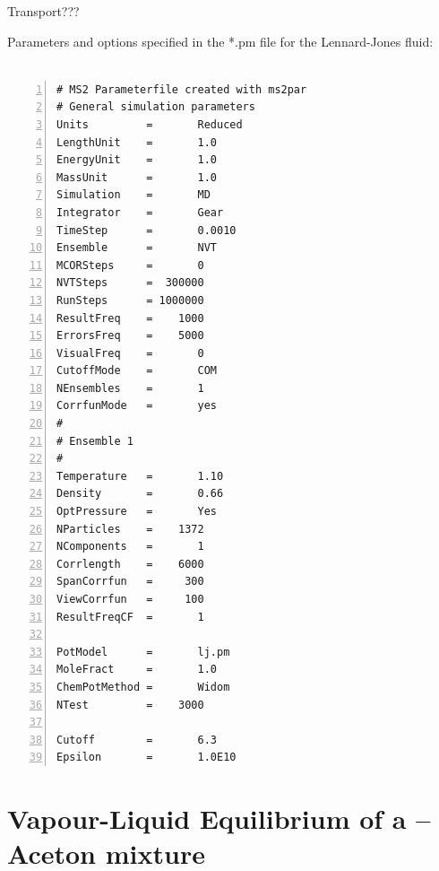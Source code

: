 Transport???


Parameters and options specified in the *.pm file for the Lennard-Jones fluid:\\\\

\begin{Verbatim}[frame=single,framesep=6.5mm,label=\fbox{Lennard-Jones fluid},numbers=left,numbersep=-10pt,xrightmargin=5cm]
# MS2 Parameterfile created with ms2par
# General simulation parameters
Units         =       Reduced
LengthUnit    =       1.0
EnergyUnit    =       1.0
MassUnit      =       1.0 
Simulation    =       MD
Integrator    =       Gear
TimeStep      =       0.0010
Ensemble      =       NVT
MCORSteps     =       0
NVTSteps      =  300000
RunSteps      = 1000000
ResultFreq    =    1000
ErrorsFreq    =    5000
VisualFreq    =       0
CutoffMode    =       COM
NEnsembles    =       1
CorrfunMode   =       yes
#
# Ensemble 1
#
Temperature   =       1.10
Density       =       0.66
OptPressure   =       Yes
NParticles    =    1372
NComponents   =       1
Corrlength    =    6000
SpanCorrfun   =     300
ViewCorrfun   =     100
ResultFreqCF  =       1

PotModel      =       lj.pm
MoleFract     =       1.0
ChemPotMethod =       Widom
NTest         =    3000

Cutoff        =       6.3
Epsilon       =       1.0E10
\end{Verbatim}

\vspace{1cm}






\section{Vapour-Liquid Equilibrium of a  -- Aceton mixture}
\label{sec:Example_Vapour-Liquid Equilibrium of a O2 - Aceton mixture}

